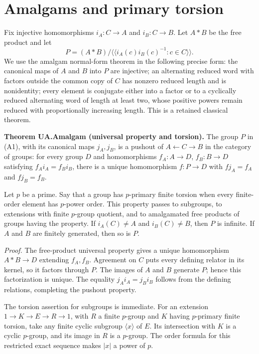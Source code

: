 \section{Amalgams and primary torsion}\label{amalgams-and-primary-torsion}

Fix injective homomorphisms \(i_A:C\to A\) and \(i_B:C\to B\). Let
\(A*B\) be the free product and let \[
P=(A*B)/\langle\!\langle i_A(c)i_B(c)^{-1}:c\in C\rangle\!\rangle.
\tag{A1}
\] We use the amalgam normal-form theorem in the following precise form:
the canonical maps of \(A\) and \(B\) into \(P\) are injective; an
alternating reduced word with factors outside the common copy of \(C\)
has nonzero reduced length and is nonidentity; every element is
conjugate either into a factor or to a cyclically reduced alternating
word of length at least two, whose positive powers remain reduced with
proportionally increasing length. This is a retained classical theorem.

\textbf{Theorem UA.Amalgam (universal property and torsion).} The group
\(P\) in (A1), with its canonical maps \(j_A,j_B\), is a pushout of
\(A\leftarrow C\to B\) in the category of groups: for every group \(D\)
and homomorphisms \(f_A:A\to D\), \(f_B:B\to D\) satisfying
\(f_Ai_A=f_Bi_B\), there is a unique homomorphism \(f:P\to D\) with
\(fj_A=f_A\) and \(fj_B=f_B\).

Let \(p\) be a prime. Say that a group has \(p\)-primary finite torsion
when every finite-order element has \(p\)-power order. This property
passes to subgroups, to extensions with finite \(p\)-group quotient, and
to amalgamated free products of groups having the property. If
\(i_A(C)\ne A\) and \(i_B(C)\ne B\), then \(P\) is infinite. If \(A\)
and \(B\) are finitely generated, then so is \(P\).

\emph{Proof.} The free-product universal property gives a unique
homomorphism \(A*B\to D\) extending \(f_A,f_B\). Agreement on \(C\) puts
every defining relator in its kernel, so it factors through \(P\). The
images of \(A\) and \(B\) generate \(P\); hence this factorization is
unique. The equality \(j_Ai_A=j_Bi_B\) follows from the defining
relations, completing the pushout property.

The torsion assertion for subgroups is immediate. For an extension
\(1\to K\to E\to R\to1\), with \(R\) a finite \(p\)-group and \(K\)
having \(p\)-primary finite torsion, take any finite cyclic subgroup
\(\langle x\rangle\) of \(E\). Its intersection with \(K\) is a cyclic
\(p\)-group, and its image in \(R\) is a \(p\)-group. The order formula
for this restricted exact sequence makes \(|x|\) a power of \(p\).

